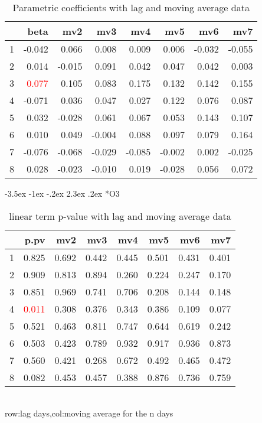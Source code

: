 \documentclass[a4paper, 12pt]{article}
\makeatletter
\def\large{\fontsize{14}{20}\selectfont}
\renewcommand\subsection{\@startsection {subsection}{1}{\z@}%
                                   {-3.5ex \@plus -1ex \@minus -.2ex}%
                                   {2.3ex \@plus.2ex}%
                                   {\centering\normalfont\large\bfseries}}
\makeatother
\begin{document}
\begin{table}[h]
\centering
\caption{Parametric coefficients with lag and moving average data}
\begin{tabular}{rrrrrrrr}
  \hline
 & beta & mv2 & mv3 & mv4 & mv5 & mv6 & mv7 \\
  \hline
1 & -0.042 & 0.066 & 0.008 & 0.009 & 0.006 & -0.032 & -0.055 \\
  2 & 0.014 & -0.015 & 0.091 & 0.042 & 0.047 & 0.042 & 0.003 \\
  3 & \textcolor{red}{0.077} & 0.105 & 0.083 & 0.175 & 0.132 & 0.142 & 0.155 \\
  4 & -0.071 & 0.036 & 0.047 & 0.027 & 0.122 & 0.076 & 0.087 \\
  5 & 0.032 & -0.028 & 0.061 & 0.067 & 0.053 & 0.143 & 0.107 \\
  6 & 0.010 & 0.049 & -0.004 & 0.088 & 0.097 & 0.079 & 0.164 \\
  7 & -0.076 & -0.068 & -0.029 & -0.085 & -0.002 & 0.002 & -0.025 \\
  8 & 0.028 & -0.023 & -0.010 & 0.019 & -0.028 & 0.056 & 0.072 \\
   \hline
\end{tabular}
\end{table}
\clearpage
\subsection*{O3}
\begin{table}[h]
\centering
\caption{linear term p-value with lag and moving average data}
\begin{tabular}{rrrrrrrr}
  \hline
 & p.pv & mv2 & mv3 & mv4 & mv5 & mv6 & mv7 \\
  \hline
1 & 0.825 & 0.692 & 0.442 & 0.445 & 0.501 & 0.431 & 0.401 \\
  2 & 0.909 & 0.813 & 0.894 & 0.260 & 0.224 & 0.247 & 0.170 \\
  3 & 0.851 & 0.969 & 0.741 & 0.706 & 0.208 & 0.144 & 0.148 \\
  4 & \textcolor{red}{0.011} & 0.308 & 0.376 & 0.343 & 0.386 & 0.109 & 0.077 \\
  5 & 0.521 & 0.463 & 0.811 & 0.747 & 0.644 & 0.619 & 0.242 \\
  6 & 0.503 & 0.423 & 0.789 & 0.932 & 0.917 & 0.936 & 0.873 \\
  7 & 0.560 & 0.421 & 0.268 & 0.672 & 0.492 & 0.465 & 0.472 \\
  8 & 0.082 & 0.453 & 0.457 & 0.388 & 0.876 & 0.736 & 0.759 \\
   \hline
\end{tabular}
\\row:lag days,col:moving average for the n days
\end{table}
\end{document}
